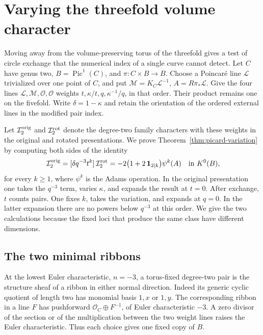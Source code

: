 \section{Varying the threefold volume character}\label{sec:variation}

Moving away from the volume-preserving torus of the threefold gives a
test of circle exchange that the numerical index of a single curve cannot
detect. Let \(C\) have genus two, \(B=\operatorname{Pic}^1(C)\), and
\(\pi:C\times B\to B\). Choose a Poincar\'e line \(\mathcal L\) trivialized
over one point of \(C\), and put
\(\mathcal M=K_C\mathcal L^{-1}\), \(A=R\pi_*\mathcal L\).
Give the four lines \(\mathcal L,\mathcal M,\mathcal O,\mathcal O\)
weights \(t,\kappa/t,q,\kappa^{-1}/q\), in that order. Their product
remains one on the fivefold. Write \(\delta=1-\kappa\) and retain the
orientation of the ordered external lines in the modified pair index.

Let \(\mathcal I_2^{\rm orig}\) and \(\mathcal I_2^{\rm rot}\) denote
the degree-two family characters with these weights in the original
and rotated presentations. We prove Theorem~\ref{thm:picard-variation}
by computing both sides of the identity
\begin{equation}
 [\delta q^{-3} t^k]\,\mathcal I_2^{\rm orig}
 =[\delta q^{-3} t^k]\,\mathcal I_2^{\rm rot}
 =-2\bigl(1+2\,\mathbf 1_{2\mid k}\bigr)\psi^k(A)
 \quad\text{in }K^0(B),
 \label{eq:circle-volume-edge}
\end{equation}
for every \(k\geq1\), where \(\psi^k\) is the Adams operation. In the original presentation
one takes the \(q^{-3}\) term, varies \(\kappa\), and expands the
result at \(t=0\). After exchange, \(t\) counts pairs. One fixes \(k\),
takes the variation, and expands at \(q=0\). In the latter expansion
there are no powers below \(q^{-3}\) at this order. We give the two
calculations because the fixed loci that produce the same class
have different dimensions.

\subsection{The two minimal ribbons}

At the lowest Euler characteristic, \(n=-3\), a torus-fixed degree-two
pair is the structure sheaf of a ribbon in either normal direction.
Indeed its generic cyclic quotient of length two has monomial basis
\(1,x\) or \(1,y\). The corresponding ribbon in a line \(F\) has
pushforward \(\mathcal O_C\oplus F^{-1}\), of Euler characteristic
\(-3\). A zero divisor of the section or of the multiplication between
the two weight lines raises the Euler characteristic. Thus each
choice gives one fixed copy of \(B\).


